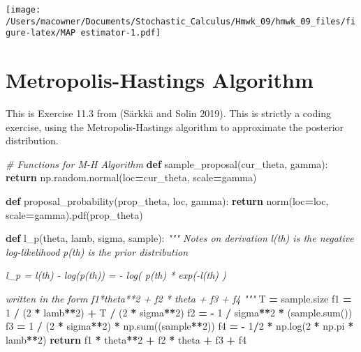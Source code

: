 \documentclass[]{article}
\newenvironment{Shaded}{\begin{snugshade}}{\end{snugshade}}
\newcommand{\BuiltInTok}[1]{#1}
\newcommand{\CommentTok}[1]{\textcolor[rgb]{0.56,0.35,0.01}{\textit{#1}}}
\newcommand{\ControlFlowTok}[1]{\textcolor[rgb]{0.13,0.29,0.53}{\textbf{#1}}}
\newcommand{\DecValTok}[1]{\textcolor[rgb]{0.00,0.00,0.81}{#1}}
\newcommand{\KeywordTok}[1]{\textcolor[rgb]{0.13,0.29,0.53}{\textbf{#1}}}
\newcommand{\NormalTok}[1]{#1}
\newcommand{\OperatorTok}[1]{\textcolor[rgb]{0.81,0.36,0.00}{\textbf{#1}}}
\begin{document}
\texttt{[image: /Users/macowner/Documents/Stochastic\_Calculus/Hmwk\_09/hmwk\_09\_files/figure-latex/MAP estimator-1.pdf]}

\hypertarget{metropolis-hastings-algorithm}{%
\section{Metropolis-Hastings
Algorithm}\label{metropolis-hastings-algorithm}}

This is Exercise 11.3 from (Särkkä and Solin 2019). This is strictly a
coding exercise, using the Metropolis-Hastings algorithm to approximate
the posterior distribution.

\begin{Shaded}
\begin{Highlighting}[]
\CommentTok{# Functions for M-H Algorithm}
\KeywordTok{def}\NormalTok{ sample_proposal(cur_theta, gamma):}
    \ControlFlowTok{return}\NormalTok{ np.random.normal(loc}\OperatorTok{=}\NormalTok{cur_theta, scale}\OperatorTok{=}\NormalTok{gamma)}


\KeywordTok{def}\NormalTok{ proposal_probability(prop_theta, loc, gamma):}
    \ControlFlowTok{return}\NormalTok{ norm(loc}\OperatorTok{=}\NormalTok{loc, scale}\OperatorTok{=}\NormalTok{gamma).pdf(prop_theta)}


\KeywordTok{def}\NormalTok{ l_p(theta, lamb, sigma, sample):}
    \CommentTok{""" Notes on derivation}
\CommentTok{    l(th) is the negative log-likelihood}
\CommentTok{    p(th) is the prior distribution}

\CommentTok{    l_p = l(th) - log(p(th))}
\CommentTok{        = - log( p(th) * exp(-l(th) )}

\CommentTok{    written in the form f1*theta**2 + f2 * theta + f3 + f4}
\CommentTok{    """}
\NormalTok{    T }\OperatorTok{=}\NormalTok{ sample.size}
\NormalTok{    f1 }\OperatorTok{=} \DecValTok{1} \OperatorTok{/}\NormalTok{ (}\DecValTok{2} \OperatorTok{*}\NormalTok{ lamb}\OperatorTok{**}\DecValTok{2}\NormalTok{) }\OperatorTok{+}\NormalTok{ T }\OperatorTok{/}\NormalTok{ (}\DecValTok{2} \OperatorTok{*}\NormalTok{ sigma}\OperatorTok{**}\DecValTok{2}\NormalTok{)}
\NormalTok{    f2 }\OperatorTok{=} \OperatorTok{-} \DecValTok{1} \OperatorTok{/}\NormalTok{ sigma}\OperatorTok{**}\DecValTok{2} \OperatorTok{*}\NormalTok{ (sample.}\BuiltInTok{sum}\NormalTok{())}
\NormalTok{    f3 }\OperatorTok{=} \DecValTok{1} \OperatorTok{/}\NormalTok{ (}\DecValTok{2} \OperatorTok{*}\NormalTok{ sigma}\OperatorTok{**}\DecValTok{2}\NormalTok{) }\OperatorTok{*}\NormalTok{ np.}\BuiltInTok{sum}\NormalTok{((sample}\OperatorTok{**}\DecValTok{2}\NormalTok{))}
\NormalTok{    f4 }\OperatorTok{=} \OperatorTok{-} \DecValTok{1}\OperatorTok{/}\DecValTok{2} \OperatorTok{*}\NormalTok{ np.log(}\DecValTok{2} \OperatorTok{*}\NormalTok{ np.pi }\OperatorTok{*}\NormalTok{ lamb}\OperatorTok{**}\DecValTok{2}\NormalTok{)}
    \ControlFlowTok{return}\NormalTok{ f1 }\OperatorTok{*}\NormalTok{ theta}\OperatorTok{**}\DecValTok{2} \OperatorTok{+}\NormalTok{ f2 }\OperatorTok{*}\NormalTok{ theta }\OperatorTok{+}\NormalTok{ f3 }\OperatorTok{+}\NormalTok{ f4}



\end{Highlighting}
\end{Shaded}
\end{document}
